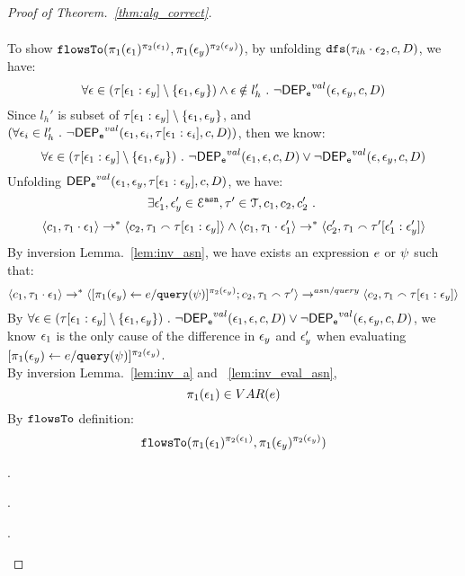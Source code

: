 \begin{proof}[Proof of Theorem.~\ref{thm:alg_correct}]
\begin{case}
\begin{subcase}
\begin{subsubcase}
\[\begin{array}{l}
\end{array}
\]
%
%
To show $\mathtt{flowsTo}(\pi_1(\mathtt{\epsilon}_1)^{\pi_2(\mathtt{\epsilon}_1)}, \pi_1(\mathtt{\epsilon}_y)^{\pi_2(\mathtt{\epsilon}_y)})$, 
%
by unfolding $\mathtt{dfs}(\mathtt{\tau}_{ih}\cdot \mathtt{\epsilon}_2, c, D) $, we have:
\[
  \forall \mathtt{\epsilon} \in (\mathtt{\tau}[\mathtt{\epsilon}_1:\mathtt{\epsilon}_y]\setminus \{\mathtt{\epsilon}_1, \mathtt{\epsilon}_y\}) 
 \land \mathtt{\epsilon} \notin l_h' 
 ~.~ 
 \neg \mathsf{DEP_{\mathtt{e}}}^{val} (\mathtt{\epsilon}, \mathtt{\epsilon}_y, c, D)
\]
%
Since $l_{h}'$ is subset of $\mathtt{\tau}[\mathtt{\epsilon}_1:\mathtt{\epsilon}_y] \setminus \{\mathtt{\epsilon}_1, \mathtt{\epsilon}_y\}$, and $(\forall \mathtt{\epsilon}_i \in l_{h}' ~.~ \neg \mathsf{DEP_{\mathtt{e}}}^{val} (\mathtt{\epsilon}_1, \mathtt{\epsilon}_i, \mathtt{\tau}[\mathtt{\epsilon}_1: \mathtt{\epsilon}_i], c, D))$,
then we know:
\[
  \forall \mathtt{\epsilon} \in (\mathtt{\tau}[\mathtt{\epsilon}_1:\mathtt{\epsilon}_y]\setminus \{\mathtt{\epsilon}_1, \mathtt{\epsilon}_y\}) ~.~
  \neg \mathsf{DEP_{\mathtt{e}}}^{val} (\mathtt{\epsilon}_1, \mathtt{\epsilon}, c, D) \lor \neg \mathsf{DEP_{\mathtt{e}}}^{val} (\mathtt{\epsilon}, \mathtt{\epsilon}_y, c, D)
\]
%
Unfolding $\mathsf{DEP_{\mathtt{e}}}^{val}(\mathtt{\epsilon}_1, \mathtt{\epsilon}_y, \mathtt{\tau}[\mathtt{\epsilon}_1:\mathtt{\epsilon}_y], c, D)$, we have:
\[
  \exists \mathtt{\epsilon}_1', \mathtt{\epsilon}_y' \in \mathcal{E}^{\mathtt{{asn}}},
  \mathtt{\tau}' \in \mathcal{T}, c_1, c_2, c_2' ~.~
\]
%
\[
\langle c_1, \mathtt{\tau}_1 \cdot \mathtt{\epsilon}_1 \rangle \rightarrow^{*} \langle c_2, \mathtt{\tau}_1 \smallfrown \mathtt{\tau}[\mathtt{\epsilon}_1:\mathtt{\epsilon}_y] \rangle 
\land
\langle c_1, \mathtt{\tau}_1 \cdot \mathtt{\epsilon}_1' \rangle \rightarrow^{*} \langle c_2', \mathtt{\tau}_1 \smallfrown \mathtt{\tau}'[\mathtt{\epsilon}_1':\mathtt{\epsilon}_y'] \rangle 
\]
%
%
By inversion Lemma.~\ref{lem:inv_asn}, we have exists an expression $e$ or $\psi$ such that:
\[
\langle c_1, \mathtt{\tau}_1 \cdot \mathtt{\epsilon}_1 \rangle \rightarrow^{*} \langle [\mathrel{ \pi_1(\mathtt{\epsilon}_y) \leftarrow e / {\tt query}(\psi) }]{}^{\pi_2(\mathtt{\epsilon}_y)};c_2, \mathtt{\tau}_1 \smallfrown \mathtt{\tau}' \rangle \rightarrow^{asn / query} \langle c_2, \mathtt{\tau}_1 \smallfrown \mathtt{\tau}[\mathtt{\epsilon}_1:\mathtt{\epsilon}_y] \rangle 
\]
%
By $\forall \mathtt{\epsilon} \in (\mathtt{\tau}[\mathtt{\epsilon}_1:\mathtt{\epsilon}_y]\setminus \{\mathtt{\epsilon}_1, \mathtt{\epsilon}_y\}) ~.~
  \neg \mathsf{DEP_{\mathtt{e}}}^{val} (\mathtt{\epsilon}_1, \mathtt{\epsilon}, c, D) \lor \neg \mathsf{DEP_{\mathtt{e}}}^{val} (\mathtt{\epsilon}, \mathtt{\epsilon}_y, c, D)$,
we know $\mathtt{\epsilon}_1$ is the only cause of the difference in $\mathtt{\epsilon}_y$ and $\mathtt{\epsilon}_y'$ when evaluating $[\mathrel{ \pi_1(\mathtt{\epsilon}_y) \leftarrow e / {\tt query}(\psi) }]{}^{\pi_2(\mathtt{\epsilon}_y)}$.
%
\\
By inversion Lemma.~\ref{lem:inv_a} and ~\ref{lem:inv_eval_asn}, 
\[
  \pi_1(\mathtt{\epsilon}_1) \in VAR(e)
\]
%
By $\mathtt{flowsTo}$ definition:
\[
  \mathtt{flowsTo}(\pi_1(\mathtt{\epsilon}_1)^{\pi_2(\mathtt{\epsilon}_1)}, \pi_1(\mathtt{\epsilon}_y)^{\pi_2(\mathtt{\epsilon}_y)})
\]
%
\end{subsubcase}
%
\end{subcase}
%
\begin{subcase}.
%
\end{subcase}
%
\begin{subcase}.
%
\end{subcase}
%
\begin{subcase}.
%
\end{subcase}
%
\end{case}
%
\end{proof}